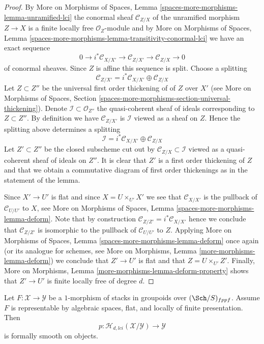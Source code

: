 \begin{proof}
By
More on Morphisms of Spaces,
Lemma \ref{spaces-more-morphisms-lemma-unramified-lci}
the conormal sheaf $\mathcal{C}_{Z/X}$ of the unramified morphism $Z \to X$
is a finite locally free $\mathcal{O}_Z$-module and by
More on Morphisms of Spaces,
Lemma \ref{spaces-more-morphisms-lemma-transitivity-conormal-lci}
we have an exact sequence
$$
0 \to i^*\mathcal{C}_{X/X'} \to
\mathcal{C}_{Z/X'} \to
\mathcal{C}_{Z/X} \to 0
$$
of conormal sheaves. Since $Z$ is affine this sequence is split. Choose
a splitting
$$
\mathcal{C}_{Z/X'} = i^*\mathcal{C}_{X/X'} \oplus \mathcal{C}_{Z/X}
$$
Let $Z \subset Z''$ be the universal first order thickening of of $Z$
over $X'$ (see
More on Morphisms of Spaces,
Section \ref{spaces-more-morphisms-section-universal-thickening}).
Denote $\mathcal{I} \subset \mathcal{O}_{Z''}$ the quasi-coherent sheaf
of ideals corresponding to $Z \subset Z''$. By definition we have
$\mathcal{C}_{Z/X'}$ is $\mathcal{I}$ viewed as a sheaf on $Z$.
Hence the splitting above determines a splitting
$$
\mathcal{I} = i^*\mathcal{C}_{X/X'} \oplus \mathcal{C}_{Z/X}
$$
Let $Z' \subset Z''$ be the closed subscheme cut out by
$\mathcal{C}_{Z/X} \subset \mathcal{I}$ viewed as a quasi-coherent sheaf
of ideals on $Z''$. It is clear that $Z'$ is a first order thickening
of $Z$ and that we obtain a commutative diagram of first order thickenings
as in the statement of the lemma.

\medskip\noindent
Since $X' \to U'$ is flat and since $X = U \times_{U'} X'$ we see that
$\mathcal{C}_{X/X'}$ is the pullback of $\mathcal{C}_{U/U'}$ to $X$, see
More on Morphisms of Spaces, Lemma \ref{spaces-more-morphisms-lemma-deform}.
Note that by construction $\mathcal{C}_{Z/Z'} = i^*\mathcal{C}_{X/X'}$
hence we conclude that $\mathcal{C}_{Z/Z'}$ is isomorphic to the pullback
of $\mathcal{C}_{U/U'}$ to $Z$. Applying
More on Morphisms of Spaces, Lemma \ref{spaces-more-morphisms-lemma-deform}
once again (or its analogue for schemes, see
More on Morphisms, Lemma \ref{more-morphisms-lemma-deform})
we conclude that $Z' \to U'$ is flat and that $Z = U \times_{U'} Z'$.
Finally,
More on Morphisms, Lemma \ref{more-morphisms-lemma-deform-property}
shows that $Z' \to U'$ is finite locally free of degree $d$.
\end{proof}

\begin{lemma}
\label{lemma-lci-formally-smooth}
Let $F : \mathcal{X} \to \mathcal{Y}$ be a $1$-morphism of stacks in groupoids
over $(\Sch/S)_{fppf}$. Assume $F$ is representable by algebraic
spaces, flat, and locally of finite presentation. Then
$$
p : \mathcal{H}_{d, lci}(\mathcal{X}/\mathcal{Y}) \to \mathcal{Y}
$$
is formally smooth on objects.
\end{lemma}

